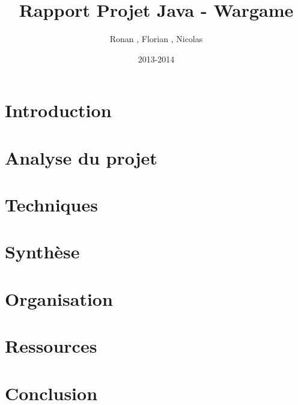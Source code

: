 \documentclass{report}
\title{Rapport Projet Java - Wargame}
\author{Ronan \bsc{Abhamon}, Florian \bsc{Bigard}, Nicolas \bsc{Reynaud}}
\date{2013-2014}
\begin{document}
\maketitle
\renewcommand{\contentsname}{Sommaire}
\tableofcontents
\newpage


\section{Introduction}
\section{Analyse du projet}
\section{Techniques}
\section{Synthèse}
\section{Organisation}
\section{Ressources}
\section{Conclusion}
\end{document}
